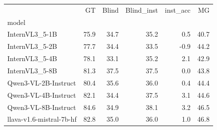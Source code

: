 \begin{tabular}{lrrrrr}
\toprule
 & GT & Blind & Blind_inst & inst_acc & MG \\
model &  &  &  &  &  \\
\midrule
InternVL3_5-1B & 75.9 & 34.7 & 35.2 & 0.5 & 40.7 \\
InternVL3_5-2B & 77.7 & 34.4 & 33.5 & -0.9 & 44.2 \\
InternVL3_5-4B & 78.1 & 33.1 & 35.2 & 2.1 & 42.9 \\
InternVL3_5-8B & 81.3 & 37.5 & 37.5 & 0.0 & 43.8 \\
Qwen3-VL-2B-Instruct & 80.4 & 35.6 & 36.0 & 0.4 & 44.4 \\
Qwen3-VL-4B-Instruct & 82.1 & 34.4 & 37.5 & 3.1 & 44.6 \\
Qwen3-VL-8B-Instruct & 84.6 & 34.9 & 38.1 & 3.2 & 46.5 \\
llava-v1.6-mistral-7b-hf & 82.8 & 35.0 & 36.0 & 1.0 & 46.8 \\
\bottomrule
\end{tabular}
